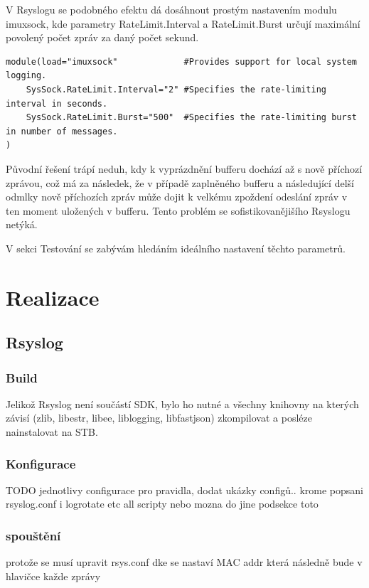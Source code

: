 \documentclass[thesis=B,czech]{FITthesis}[2012/06/26]
\begin{document}
V Rsyslogu se podobného efektu dá dosáhnout prostým nastavením modulu imuxsock, kde parametry RateLimit.Interval a RateLimit.Burst určují maximální povolený počet zpráv za daný počet sekund.
\begin{scriptsize}
\begin{verbatim}
module(load="imuxsock"             #Provides support for local system logging.
	SysSock.RateLimit.Interval="2" #Specifies the rate-limiting interval in seconds.
	SysSock.RateLimit.Burst="500"  #Specifies the rate-limiting burst in number of messages.
)
\end{verbatim}
\end{scriptsize}
Původní řešení trápí neduh, kdy k vyprázdnění bufferu dochází až s nově příchozí zprávou, což má za následek, že v případě zaplněného bufferu a následující delší odmlky nově příchozích zpráv může dojit k velkému zpoždení odeslání zpráv v ten moment uložených v bufferu. Tento problém se sofistikovanějišího Rsyslogu netýká.

V sekci Testování se zabývám hledáním ideálního nastavení těchto parametrů.

\chapter{Realizace}

\section{Rsyslog}

\subsection{Build}
Jelikož Rsyslog není součástí SDK, bylo ho nutné a všechny knihovny na kterých závisí (zlib, libestr, libee, liblogging, libfastjson) zkompilovat a posléze nainstalovat na STB.




\subsection{Konfigurace}

TODO jednotlivy configurace pro pravidla, dodat ukázky configů..
krome popsani rsyslog.conf i logrotate etc all scripty
nebo mozna do jine podsekce toto

\subsection{spouštění}
protože se musí upravit rsys.conf dke se nastaví MAC addr která následně bude v hlavičce každe zprávy
\end{document}
